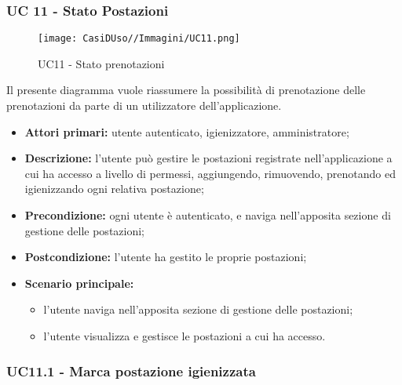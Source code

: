 \subsubsection{UC 11 - Stato Postazioni}

\begin{figure}[h]
  \centering
    \texttt{[image: CasiDUso//Immagini/UC11.png]}
  \caption{UC11  - Stato prenotazioni}
\end{figure}

Il presente diagramma vuole riassumere la possibilità di prenotazione delle prenotazioni da parte di un utilizzatore dell’applicazione.

\begin{itemize}
\item \textbf{Attori primari:} utente autenticato, igienizzatore, amministratore;
\item \textbf{Descrizione:} l’utente può gestire le postazioni registrate nell’applicazione a cui ha accesso a livello di permessi, aggiungendo, rimuovendo, prenotando ed igienizzando ogni relativa postazione;
\item \textbf{Precondizione:} ogni utente è autenticato, e naviga nell’apposita sezione di gestione delle postazioni;
\item \textbf{Postcondizione:} l’utente ha gestito le proprie postazioni;
\item \textbf{Scenario principale:} 
	\begin{itemize}
		\item l’utente naviga nell’apposita sezione di gestione delle postazioni;
		\item l’utente visualizza e gestisce le postazioni a cui ha accesso.
	\end{itemize}
\end{itemize}

\subsubsection{UC11.1 - Marca postazione igienizzata}


